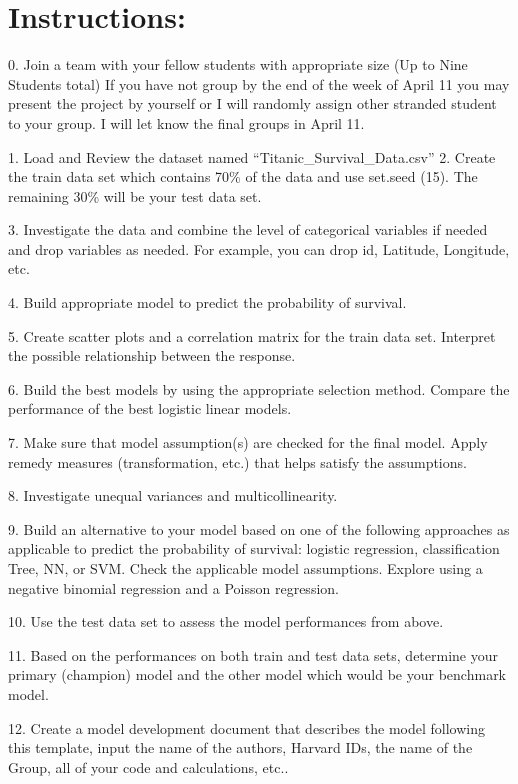\documentclass[
  letterpaper,
  DIV=11,
  numbers=noendperiod]{scrartcl}
\begin{document}
\section{Instructions:}\label{instructions}

0. Join a team with your fellow students with appropriate size (Up to
Nine Students total) If you have not group by the end of the week of
April 11 you may present the project by yourself or I will randomly
assign other stranded student to your group. I will let know the final
groups in April 11.

1. Load and Review the dataset named ``Titanic\_Survival\_Data.csv'' 2.
Create the train data set which contains 70\% of the data and use
set.seed (15). The remaining 30\% will be your test data set.

3. Investigate the data and combine the level of categorical variables
if needed and drop variables as needed. For example, you can drop id,
Latitude, Longitude, etc.

4. Build appropriate model to predict the probability of survival.

5. Create scatter plots and a correlation matrix for the train data set.
Interpret the possible relationship between the response.

6. Build the best models by using the appropriate selection method.
Compare the performance of the best logistic linear models.

7. Make sure that model assumption(s) are checked for the final model.
Apply remedy measures (transformation, etc.) that helps satisfy the
assumptions.

8. Investigate unequal variances and multicollinearity.

9. Build an alternative to your model based on one of the following
approaches as applicable to predict the probability of survival:
logistic regression, classification Tree, NN, or SVM. Check the
applicable model assumptions. Explore using a negative binomial
regression and a Poisson regression.

10. Use the test data set to assess the model performances from above.

11. Based on the performances on both train and test data sets,
determine your primary (champion) model and the other model which would
be your benchmark model.

12. Create a model development document that describes the model
following this template, input the name of the authors, Harvard IDs, the
name of the Group, all of your code and calculations, etc..
\end{document}
